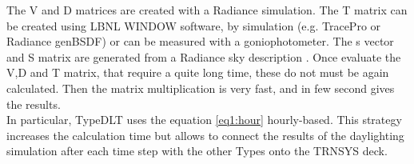 The V and D matrices are created with a Radiance simulation. The T matrix can be created using LBNL 
WINDOW software, by simulation (e.g. TracePro or Radiance genBSDF) or can be measured with a 
goniophotometer. The s vector and S matrix are generated from a Radiance sky description \cite{3ph_tut}.
Once evaluate the V,D and T matrix, that require a quite long time, these do not must be again calculated. Then the matrix multiplication is very fast, and in few second gives the results.\\

In particular, TypeDLT uses the equation \ref{eq1:hour} hourly-based. This strategy increases the calculation time but allows to connect the results of the daylighting simulation after each time step with the other Types onto the TRNSYS deck.






